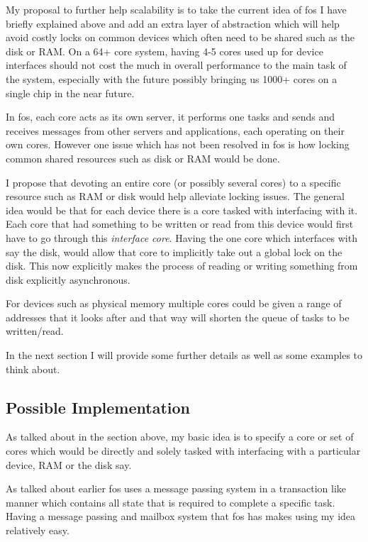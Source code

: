 \documentclass[journal]{IEEEtran}
\begin{document}
My proposal to further help scalability is to take the current idea of fos I have briefly explained above and add an extra layer of abstraction which will help avoid costly locks on common devices which often need to be shared such as the disk or RAM. On a 64+ core system, having 4-5 cores used up for device interfaces should not cost the much in overall performance to the main task of the system, especially with the future possibly bringing us 1000+ cores on a single chip in the near future. 

In fos, each core acts as its own server, it performs one tasks and sends and receives messages from other servers and applications, each operating on their own cores. However one issue which has not been resolved in fos is how locking common shared resources such as disk or RAM would be done. 

I propose that devoting an entire core (or possibly several cores) to a specific resource such as RAM or disk would help alleviate locking issues. The general idea would be that for each device there is a core tasked with interfacing with it. Each core that had something to be written or read from this device would first have to go through this \emph{interface core}. Having the one core which interfaces with say the disk, would allow that core to implicitly take out a global lock on the disk. This now explicitly makes the process of reading or writing something from disk explicitly asynchronous. 

For devices such as physical memory multiple cores could be given a range of addresses that it looks after and that way will shorten the queue of tasks to be written/read.

In the next section I will provide some further details as well as some examples to think about.

\subsection{Possible Implementation}

As talked about in the section above, my basic idea is to specify a core or set of cores which would be directly and solely tasked with interfacing with a particular device, RAM or the disk say. 

As talked about earlier fos uses a message passing system in a transaction like manner which contains all state that is required to complete a specific task. Having a message passing and mailbox system that fos has makes using my idea relatively easy.
\end{document}
